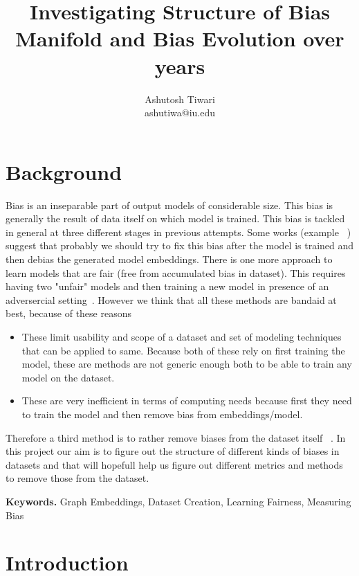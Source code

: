 \documentclass[english]{sobraep}
\title{Investigating Structure of Bias Manifold and Bias Evolution over years}
\author{Ashutosh Tiwari\\
	\normalsize ashutiwa@iu.edu
}
\begin{document}
\maketitle



\section{Background}

Bias is an inseparable part of output models of considerable size. This bias is generally the result of data itself on which model is trained. This bias is tackled in general at three different stages in previous attempts. Some works (example ~\cite{DBLP:journals/corr/BolukbasiCZSK16a}) suggest that probably we should try to fix this bias after the model is trained and then debias the generated model embeddings. There is one more approach to learn models  that are fair (free from accumulated bias in dataset). This requires having two "unfair" models and then training a new model in presence of an adversercial setting~\cite{kenna_using_2021}. However we think that all these methods are bandaid at best, because of these reasons \begin{itemize}
    \item These limit usability and scope of a dataset and set of modeling techniques that can be applied to same. Because both of these rely on first training the model, these are methods are not generic enough both to be able to train any model on the dataset.
    \item These are very inefficient in terms of computing needs because first they need to train the model and then remove bias from embeddings/model.

\end{itemize}

Therefore a third method is to rather remove biases from the dataset itself ~\cite{ravfogel_null_2020}. In this project our aim is to figure out the structure of different kinds of biases in datasets and that will hopefull help us figure out different metrics and methods to remove those from the dataset.



\noindent \textbf{Keywords.} Graph Embeddings, Dataset Creation, Learning Fairness, Measuring Bias


\section{Introduction}
\end{document}
